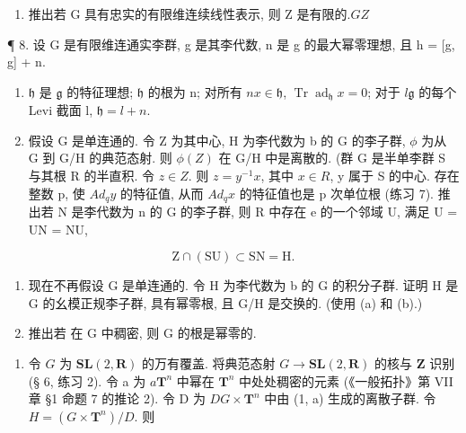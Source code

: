 \begin{enumerate}
\def\labelenumi{(\alph{enumi})}
\setcounter{enumi}{1}
\tightlist
\item
  推出若 G 具有忠实的有限维连续线性表示, 则 Z 是有限的.\(G\)\(Z\)
\end{enumerate}

¶ 8. 设 G 是有限维连通实李群, g 是其李代数, n 是 g 的最大幂零理想, 且 h = {[}g, g{]} + n.

\begin{enumerate}
\def\labelenumi{(\alph{enumi})}
\item
  \(\mathfrak{h}\) 是 \(\mathfrak{g}\) 的特征理想; \(\mathfrak{h}\) 的根为 n; 对所有 \(n\)\(x \in \mathfrak{h}\), \(\operatorname{Tr} \operatorname{ad}_{\mathfrak{h}} x = 0\); 对于 \(l\)\(\mathfrak{g}\) 的每个 Levi 截面 l, \(\mathfrak{h} = l + n\).
\item
  假设 G 是单连通的. 令 Z 为其中心, H 为李代数为 b 的 G 的李子群, \(\phi\) 为从 G 到 G/H 的典范态射. 则 \(\phi(Z)\) 在 G/H 中是离散的. (群 G 是半单李群 S 与其根 R 的半直积. 令 \(z \in Z\). 则 \(z = y^{-1}x\), 其中 \(x \in R\), y 属于 S 的中心. 存在整数 p, 使 \(Ad_{q}y\) 的特征值, 从而 \(Ad_{q}x\) 的特征值也是 p 次单位根 (练习 7). 推出若 N 是李代数为 n 的 G 的李子群, 则 R 中存在 e 的一个邻域 U, 满足 U = UN = NU,
\end{enumerate}

\[
\mathrm{Z} \cap (\mathrm{SU}) \subset \mathrm{SN} = \mathrm{H}.
\]

\begin{enumerate}
\def\labelenumi{(\alph{enumi})}
\setcounter{enumi}{2}
\item
  现在不再假设 G 是单连通的. 令 H 为李代数为 b 的 G 的积分子群. 证明 H 是 G 的幺模正规李子群, 具有幂零根, 且 G/H 是交换的. (使用 (a) 和 (b).)
\item
  推出若  在 G 中稠密, 则 G 的根是幂零的.
\end{enumerate}

\begin{enumerate}
\def\labelenumi{\arabic{enumi}.}
\setcounter{enumi}{8}
\tightlist
\item
  令 \(G\) 为 \(\mathbf{SL}(2, \mathbf{R})\) 的万有覆盖. 将典范态射 \(G \to \mathbf{SL}(2, \mathbf{R})\) 的核与 \(\mathbf{Z}\) 识别 (§ 6, 练习 2). 令 a 为 \(a\)\(\mathbf{T}^n\) 中幂在 \(\mathbf{T}^n\) 中处处稠密的元素 (《一般拓扑》第 VII 章 §1 命题 7 的推论 2). 令 D 为 \(D\)\(G \times \mathbf{T}^n\) 中由 (1, a) 生成的离散子群. 令 \(H = (G \times \mathbf{T}^n)/D\). 则
\end{enumerate}

